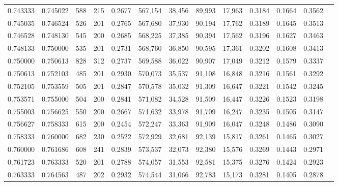 \begin{tabular}{rrrrrrrrrrrrr}
0.743333 & 0.745022 &    588 &   215 &                                     0.2677 & 567,154 &  38,456 &  89,993 &  17,963 & 0.3184 & 0.1664 & 0.3562 \\
0.745035 & 0.746524 &    526 &   201 &                                     0.2765 & 567,680 &  37,930 &  90,194 &  17,762 & 0.3189 & 0.1645 & 0.3513 \\
0.746528 & 0.748130 &    545 &   200 &                                     0.2685 & 568,225 &  37,385 &  90,394 &  17,562 & 0.3196 & 0.1627 & 0.3463 \\
0.748133 & 0.750000 &    535 &   201 &                                     0.2731 & 568,760 &  36,850 &  90,595 &  17,361 & 0.3202 & 0.1608 & 0.3413 \\
0.750000 & 0.750613 &    828 &   312 &                                     0.2737 & 569,588 &  36,022 &  90,907 &  17,049 & 0.3212 & 0.1579 & 0.3337 \\
0.750613 & 0.752103 &    485 &   201 &                                     0.2930 & 570,073 &  35,537 &  91,108 &  16,848 & 0.3216 & 0.1561 & 0.3292 \\
0.752105 & 0.753559 &    505 &   201 &                                     0.2847 & 570,578 &  35,032 &  91,309 &  16,647 & 0.3221 & 0.1542 & 0.3245 \\
0.753571 & 0.755000 &    504 &   200 &                                     0.2841 & 571,082 &  34,528 &  91,509 &  16,447 & 0.3226 & 0.1523 & 0.3198 \\
0.755003 & 0.756625 &    550 &   200 &                                     0.2667 & 571,632 &  33,978 &  91,709 &  16,247 & 0.3235 & 0.1505 & 0.3147 \\
0.756627 & 0.758333 &    615 &   200 &                                     0.2454 & 572,247 &  33,363 &  91,909 &  16,047 & 0.3248 & 0.1486 & 0.3090 \\
0.758333 & 0.760000 &    682 &   230 &                                     0.2522 & 572,929 &  32,681 &  92,139 &  15,817 & 0.3261 & 0.1465 & 0.3027 \\
0.760000 & 0.761686 &    608 &   241 &                                     0.2839 & 573,537 &  32,073 &  92,380 &  15,576 & 0.3269 & 0.1443 & 0.2971 \\
0.761723 & 0.763333 &    520 &   201 &                                     0.2788 & 574,057 &  31,553 &  92,581 &  15,375 & 0.3276 & 0.1424 & 0.2923 \\
0.763333 & 0.764563 &    487 &   202 &                                     0.2932 & 574,544 &  31,066 &  92,783 &  15,173 & 0.3281 & 0.1405 & 0.2878 \\

\end{tabular}
